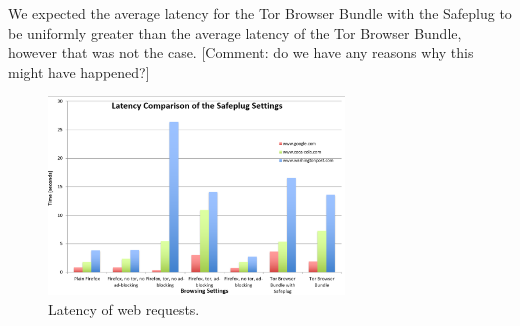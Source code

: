 We expected the average latency for the Tor Browser Bundle with the Safeplug to be uniformly greater than the average latency of the Tor Browser Bundle, however that was not the case. [Comment: do we have any reasons why this might have happened?] 

\begin{figure}[htb]
\begin{center}
\includegraphics[width=0.7\textwidth]{latency2}
\caption{Latency of web requests.}
\label{fig:latency2}
\end{center}
\end{figure}
